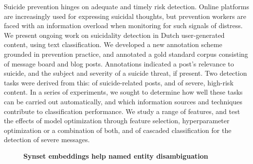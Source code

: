 \documentclass[10pt, a4paper, twopage, headinclude, footinclude, BCOR5mm]{book}
\begin{document}
\begin{table}[t!]
\end{table} 
\noindent
Suicide prevention hinges on adequate and timely risk detection. Online platforms are increasingly used for expressing suicidal thoughts, but prevention workers are faced with an information overload when monitoring for such signals of distress. We present ongoing work on suicidality detection in Dutch user-generated content, using text classification.  We developed a new annotation scheme grounded in prevention practice, and annotated a gold standard corpus consisting of message board and blog posts. Annotations indicated a post's relevance to suicide, and the subject and severity of a suicide threat, if present. Two detection tasks were derived from this: of suicide-related posts, and of severe, high-risk content.  In a series of experiments, we sought to determine how well these tasks can be carried out automatically, and which information sources and techniques contribute to classification performance. We study a range of features, and test the effects of model optimization through feature selection, hyperparameter optimization or a combination of both, and of cascaded classification for the detection of severe messages.  

\newpage

\begin{figure}[t!]
\centering
\large\textbf{Synset embeddings help named entity disambiguation}
\vspace*{0.5cm}
\end{figure}
\end{document}
